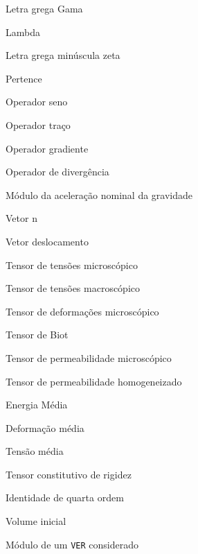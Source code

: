 %
%
%
%
%
%
\item[$ \Gamma $] 						Letra grega Gama
\item[$ \Lambda $] 						Lambda
\item[$ \zeta $] 						Letra grega minúscula zeta
\item[$ \in $] 							Pertence
%
\item[$ \sen $] 						Operador seno
\item[$ \trace $] 						Operador traço
\item[$ \grad $] 						Operador gradiente
\item[$ \diverg $]						Operador de divergência
\item[$ \gravidade $] 					Módulo da aceleração nominal da gravidade
\item[$ \vetorn $] 						Vetor n
\item[$ \desloc $] 						Vetor deslocamento
\item[$ \tensorsigma $] 				Tensor de tensões microscópico
\item[$ \tensorSigma $]					Tensor de tensões macroscópico
\item[$ \tensorepsilon $] 				Tensor de deformações microscópico
\item[$ \tensorBiot $] 					Tensor de Biot
\item[$ \tensorpermeabilidademicro $] 	Tensor de permeabilidade microscópico
\item[$ \tensorpermeabilidadehom $] 	Tensor de permeabilidade homogeneizado
\item[$ \energiamedia $] 				Energia Média
\item[$ \defmedia $] 					Deformação média
\item[$ \tensaomedia $] 				Tensão média
\item[$ \tensorC $] 					Tensor constitutivo de rigidez
\item[$ \identidadequarta $] 			Identidade de quarta ordem
\item[$ \volumeinicial $]				Volume inicial
\item[$ \volume $] 						Módulo de um \texttt{VER} considerado





